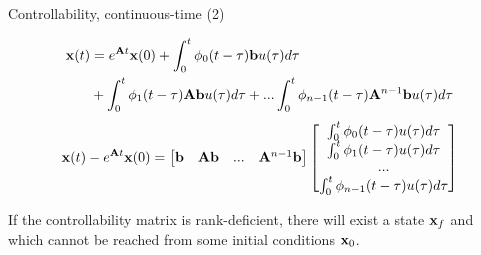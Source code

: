 \documentclass{beamer}
\begin{document}
\begin{frame}{Controllability, continuous-time (2)}
	\begin{flushleft}
		
		\begin{align*}
			\mathbf{x}(t) &= e^{\mathbf{A}t}  \mathbf{x}(0) + 
			\int_{0}^{t} \phi_0(t-\tau)\mathbf{b} u(\tau) d\tau
			\\
			&+
			\int_{0}^{t} \phi_1(t-\tau)\mathbf{A}\mathbf{b}  u(\tau) d\tau+ ... 
		    \int_{0}^{t} \phi_{n-1}(t-\tau) \mathbf{A}^{n-1} 
			\mathbf{b}  u(\tau) d\tau 
		\end{align*}
		\begin{align*}
		\mathbf{x}(t) -  e^{\mathbf{A}t}  \mathbf{x}(0) = 
		\begin{bmatrix}
			\mathbf{b} & \mathbf{A}\mathbf{b}& ... &\mathbf{A}^{n-1}\mathbf{b}
		\end{bmatrix}
		\begin{bmatrix}
			\int_{0}^{t} \phi_0(t-\tau) u(\tau) d\tau \\
			\int_{0}^{t} \phi_1(t-\tau) u(\tau) d\tau \\
			... \\
			\int_{0}^{t} \phi_{n-1}(t-\tau) u(\tau) d\tau \\
		\end{bmatrix}
		\end{align*}
		
		If the controllability matrix is rank-deficient, there will exist a state $\mathbf{x}_f$ and which cannot be reached from some initial conditions $\mathbf{x}_0$.
		
	\end{flushleft}
\end{frame}
\end{document}
